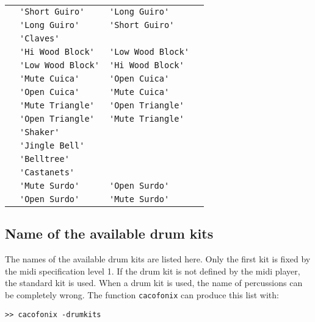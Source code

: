 \documentclass{article}
\newcommand\lvlo{}
\newcommand\lvlt{\ding{105}}
\begin{document}
\begin{center}
\begin{longtable}{llll}
 \lvlo & \lstinline!'Short Guiro'! & \lstinline!'Long Guiro'! & \\
 \lvlo & \lstinline!'Long Guiro'! & \lstinline!'Short Guiro'! & \\
 \lvlo & \lstinline!'Claves'! & & \\
 \lvlo & \lstinline!'Hi Wood Block'! & \lstinline!'Low Wood Block'! & \\
 \lvlo & \lstinline!'Low Wood Block'! & \lstinline!'Hi Wood Block'! & \\
 \lvlo & \lstinline!'Mute Cuica'! & \lstinline!'Open Cuica'! & \\
 \lvlo & \lstinline!'Open Cuica'! & \lstinline!'Mute Cuica'! & \\
 \lvlo & \lstinline!'Mute Triangle'! & \lstinline!'Open Triangle'! & \\
 \lvlo & \lstinline!'Open Triangle'! & \lstinline!'Mute Triangle'! & \\
 \lvlt & \lstinline!'Shaker'! & & \\
 \lvlt & \lstinline!'Jingle Bell'! & & \\
 \lvlt & \lstinline!'Belltree'! & & \\
 \lvlt & \lstinline!'Castanets'! & & \\
 \lvlt & \lstinline!'Mute Surdo'! & \lstinline!'Open Surdo'! & \\
 \lvlt & \lstinline!'Open Surdo'! & \lstinline!'Mute Surdo'! & \\
\end{longtable}
\end{center}

\subsection{Name of the available drum kits}
\label{sec:AvailDrumKits}

The names of the available drum kits are listed here. Only the first kit is fixed by the midi specification level 1. If the drum kit is not defined by the midi player, the standard kit is used. When a drum kit is used, the name of percussions can be completely wrong. The function \lstinline!cacofonix! can produce this list with:
\begin{lstlisting}
>> cacofonix -drumkits
\end{lstlisting}
\end{document}

